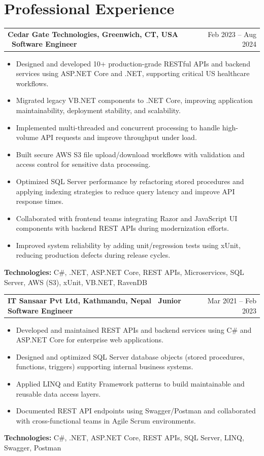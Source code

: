 \documentclass[a4paper,10pt]{article}
\makeatletter
\newenvironment{joblong}[2]
{
    \vspace{1pt}
    \begin{tabularx}{\linewidth}{@{}l X r@{}}
    \textbf{\normalsize #1} & \hfill & {\normalsize #2} \\[-1pt]
    \end{tabularx}
    \vspace{-2pt}
    \begin{minipage}[t]{\linewidth}
    \small
}
{
    \end{minipage}\vspace{1pt}
}
\makeatother
\begin{document}
\section{Professional Experience}

\begin{joblong}{Cedar Gate Technologies, Greenwich, CT, USA \textbullet\ Software Engineer}{Feb 2023 -- Aug 2024}
\begin{itemize}[label=\textbullet]
\item Designed and developed 10+ production-grade RESTful APIs and backend services using ASP.NET Core and .NET, supporting critical US healthcare workflows.
\item Migrated legacy VB.NET components to .NET Core, improving application maintainability, deployment stability, and scalability.
\item Implemented multi-threaded and concurrent processing to handle high-volume API requests and improve throughput under load.
\item Built secure AWS S3 file upload/download workflows with validation and access control for sensitive data processing.
\item Optimized SQL Server performance by refactoring stored procedures and applying indexing strategies to reduce query latency and improve API response times.
\item Collaborated with frontend teams integrating Razor and JavaScript UI components with backend REST APIs during modernization efforts.
\item Improved system reliability by adding unit/regression tests using xUnit, reducing production defects during release cycles.
\end{itemize}
\textbf{Technologies:} C\#, .NET, ASP.NET Core, REST APIs, Microservices, SQL Server, AWS (S3), xUnit, VB.NET, RavenDB
\end{joblong}

\begin{joblong}{IT Sansaar Pvt Ltd, Kathmandu, Nepal \textbullet\ Junior Software Engineer}{Mar 2021 -- Feb 2023}
\begin{itemize}[label=\textbullet]
\item Developed and maintained REST APIs and backend services using C\# and ASP.NET Core for enterprise web applications.
\item Designed and optimized SQL Server database objects (stored procedures, functions, triggers) supporting internal business systems.
\item Applied LINQ and Entity Framework patterns to build maintainable and reusable data access layers.
\item Documented REST API endpoints using Swagger/Postman and collaborated with cross-functional teams in Agile Scrum environments.
\end{itemize}
\textbf{Technologies:} C\#, .NET, ASP.NET Core, REST APIs, SQL Server, LINQ, Swagger, Postman
\end{joblong}
\end{document}
